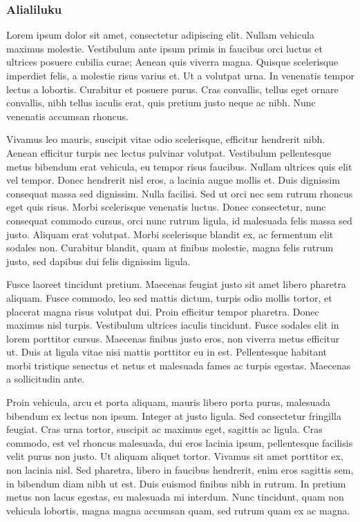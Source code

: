 \subsubsection{Alialiluku}



Lorem ipsum dolor sit amet, consectetur adipiscing elit. Nullam vehicula maximus molestie. Vestibulum ante ipsum primis in faucibus orci luctus et ultrices posuere cubilia curae; Aenean quis viverra magna. Quisque scelerisque imperdiet felis, a molestie risus varius et. Ut a volutpat urna. In venenatis tempor lectus a lobortis. Curabitur et posuere purus. Cras convallis, tellus eget ornare convallis, nibh tellus iaculis erat, quis pretium justo neque ac nibh. Nunc venenatis accumsan rhoncus.

Vivamus leo mauris, suscipit vitae odio scelerisque, efficitur hendrerit nibh. Aenean efficitur turpis nec lectus pulvinar volutpat. Vestibulum pellentesque metus bibendum erat vehicula, eu tempor risus faucibus. Nullam ultrices quis elit vel tempor. Donec hendrerit nisl eros, a lacinia augue mollis et. Duis dignissim consequat massa sed dignissim. Nulla facilisi. Sed ut orci nec sem rutrum rhoncus eget quis risus. Morbi scelerisque venenatis luctus. Donec consectetur, nunc consequat commodo cursus, orci nunc rutrum ligula, id malesuada felis massa sed justo. Aliquam erat volutpat. Morbi scelerisque blandit ex, ac fermentum elit sodales non. Curabitur blandit, quam at finibus molestie, magna felis rutrum justo, sed dapibus dui felis dignissim ligula.

Fusce laoreet tincidunt pretium. Maecenas feugiat justo sit amet libero pharetra aliquam. Fusce commodo, leo sed mattis dictum, turpis odio mollis tortor, et placerat magna risus volutpat dui. Proin efficitur tempor pharetra. Donec maximus nisl turpis. Vestibulum ultrices iaculis tincidunt. Fusce sodales elit in lorem porttitor cursus. Maecenas finibus justo eros, non viverra metus efficitur ut. Duis at ligula vitae nisi mattis porttitor eu in est. Pellentesque habitant morbi tristique senectus et netus et malesuada fames ac turpis egestas. Maecenas a sollicitudin ante.

Proin vehicula, arcu et porta aliquam, mauris libero porta purus, malesuada bibendum ex lectus non ipsum. Integer at justo ligula. Sed consectetur fringilla feugiat. Cras urna tortor, suscipit ac maximus eget, sagittis ac ligula. Cras commodo, est vel rhoncus malesuada, dui eros lacinia ipsum, pellentesque facilisis velit purus non justo. Ut aliquam aliquet tortor. Vivamus sit amet porttitor ex, non lacinia nisl. Sed pharetra, libero in faucibus hendrerit, enim eros sagittis sem, in bibendum diam nibh ut est. Duis euismod finibus nibh in rutrum. In pretium metus non lacus egestas, eu malesuada mi interdum. Nunc tincidunt, quam non vehicula lobortis, magna magna accumsan quam, sed rutrum quam ex ac magna.

